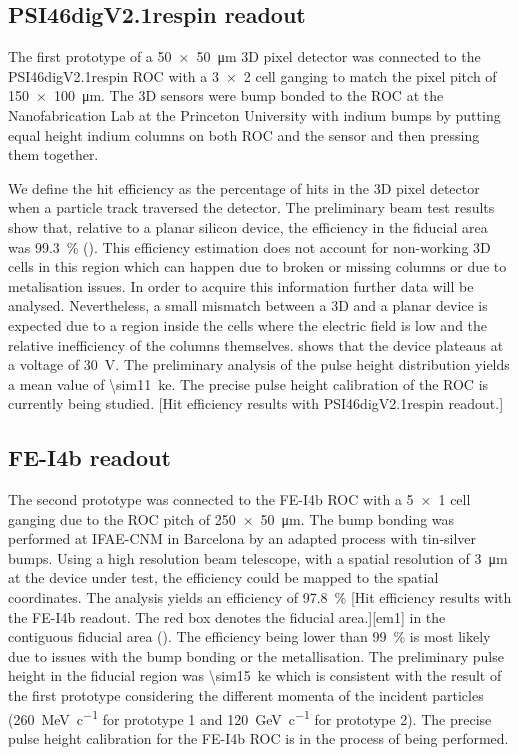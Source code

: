 \subsection{PSI46digV2.1respin readout}
The first prototype of a \SI{50x50}{\micro\meter} 3D pixel detector was connected to the PSI46digV2.1respin \ac{ROC} \cite{kornmayer} with a \SI{3x2}{} cell ganging to match the pixel pitch of \SI{150x100}{\micro\meter}. The 3D sensors were bump bonded to the \ac{ROC} at the Nanofabrication Lab at the Princeton University with indium bumps by putting equal height indium columns on both \ac{ROC} and the sensor and then pressing them together.\par
We define the hit efficiency as the percentage of hits in the 3D pixel detector when a particle track traversed the detector. The preliminary beam test results show that, relative to a planar silicon device, the efficiency in the fiducial area was \SI{99.3}{\%} (). This efficiency estimation does not account for non-working 3D cells in this region which can happen due to broken or missing columns or due to metalisation issues. In order to acquire this information further data will be analysed. Nevertheless, a small mismatch between a 3D and a planar device is expected due to a region inside the cells where the electric field is low \cite{guilio} and the relative inefficiency of the columns themselves.  shows that the device plateaus at a voltage of \SI{30}{\volt}. The preliminary analysis of the pulse height distribution yields a mean value of \SI{\sim11}{\kilo e}. The precise pulse height calibration of the \ac{ROC} is currently being studied.
[Hit efficiency results with PSI46digV2.1respin readout.]
\subsection{FE-I4b readout}
The second prototype was connected to the FE-I4b \ac{ROC} \cite{fei4} with a \SI{5x1}{} cell ganging due to the \ac{ROC} pitch of \SI{250x50}{\micro\meter}. The bump bonding was performed at IFAE-CNM in Barcelona by an adapted process with tin-silver bumps. Using a high resolution beam telescope,  with a spatial resolution of \SI{3}{\micro\meter} at the device under test, the efficiency could be mapped to the spatial coordinates. The analysis yields an efficiency of \SI{97.8}{\%} 
\vspace*{-10pt}[Hit efficiency results with the FE-I4b readout. The red box denotes the fiducial area.][em1]
in the contiguous fiducial area (). The efficiency being lower than \SI{99}{\%} is most likely due to issues with the bump bonding or the metallisation. The preliminary pulse height in the fiducial region was \SI{\sim15}{\kilo e} which is consistent with the result of the first prototype considering the different momenta of the incident particles (\SI{260}{\mega\electronvolt\per c} for prototype 1 and \SI{120}{\giga\electronvolt\per c} for prototype 2). The precise pulse height calibration for the FE-I4b \ac{ROC} is in the process of being performed.
